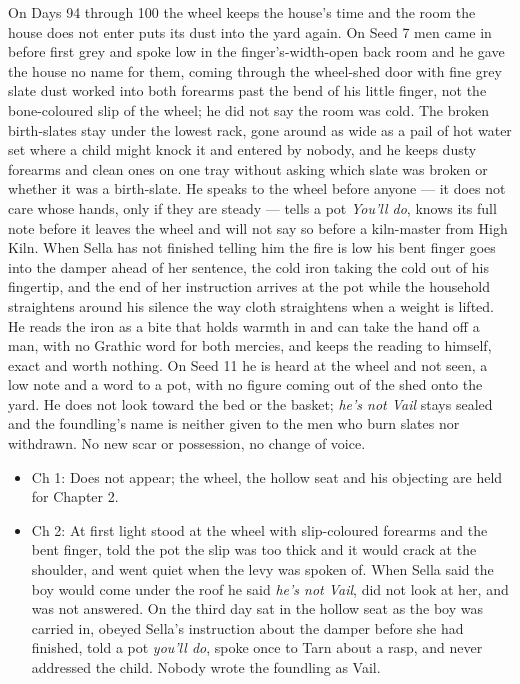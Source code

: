 \documentclass{design/chronicle}
\begin{document}
{On Days 94 through 100 the wheel keeps the house’s time and the room the house does not enter puts its dust into the yard again. On Seed 7 men came in before first grey and spoke low in the finger’s-width-open back room and he gave the house no name for them, coming through the wheel-shed door with fine grey slate dust worked into both forearms past the bend of his little finger, not the bone-coloured slip of the wheel; he did not say the room was cold. The broken birth-slates stay under the lowest rack, gone around as wide as a pail of hot water set where a child might knock it and entered by nobody, and he keeps dusty forearms and clean ones on one tray without asking which slate was broken or whether it was a birth-slate. He speaks to the wheel before anyone --- it does not care whose hands, only if they are steady --- tells a pot \emph{You’ll do}, knows its full note before it leaves the wheel and will not say so before a kiln-master from High Kiln. When Sella has not finished telling him the fire is low his bent finger goes into the damper ahead of her sentence, the cold iron taking the cold out of his fingertip, and the end of her instruction arrives at the pot while the household straightens around his silence the way cloth straightens when a weight is lifted. He reads the iron as a bite that holds warmth in and can take the hand off a man, with no Grathic word for both mercies, and keeps the reading to himself, exact and worth nothing. On Seed 11 he is heard at the wheel and not seen, a low note and a word to a pot, with no figure coming out of the shed onto the yard. He does not look toward the bed or the basket; \emph{he’s not Vail} stays sealed and the foundling’s name is neither given to the men who burn slates nor withdrawn. No new scar or possession, no change of voice.

\begin{itemize}[leftmargin=1.4em,itemsep=1pt,topsep=3pt,parsep=0pt]

\item Ch 1: Does not appear; the wheel, the hollow seat and his objecting are held for Chapter 2.

\item Ch 2: At first light stood at the wheel with slip-coloured forearms and the bent finger, told the pot the slip was too thick and it would crack at the shoulder, and went quiet when the levy was spoken of. When Sella said the boy would come under the roof he said \emph{he’s not Vail}, did not look at her, and was not answered. On the third day sat in the hollow seat as the boy was carried in, obeyed Sella’s instruction about the damper before she had finished, told a pot \emph{you’ll do}, spoke once to Tarn about a rasp, and never addressed the child. Nobody wrote the foundling as Vail.


\end{itemize}}
\end{document}
